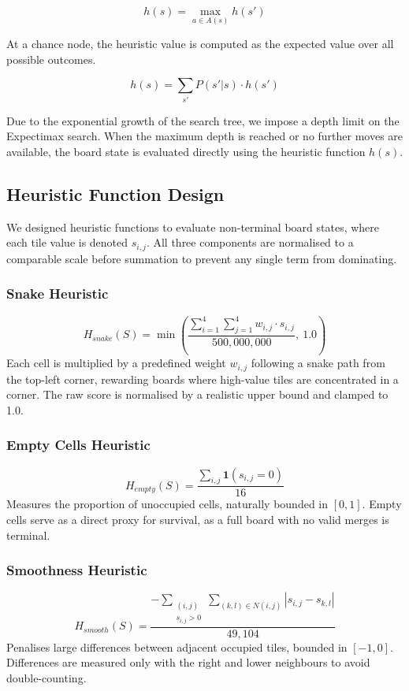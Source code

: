 \documentclass{article}
\begin{document}
$$h(s) = \max_{a \in A(s)} h(s')$$

At a chance node, the heuristic value is computed as the expected value over all possible outcomes.

$$h(s) = \sum_{s'} P(s'|s) \cdot h(s')$$

Due to the exponential growth of the search tree, we impose a depth limit on the Expectimax search.
When the maximum depth is reached or no further moves are available, the board state is evaluated directly
using the heuristic function $h(s)$.

\subsection{Heuristic Function Design}
We designed heuristic functions to evaluate non-terminal board states, where each tile value is denoted $s_{i,j}$.
All three components are normalised to a comparable scale before summation to prevent any single term from dominating.

\subsubsection{Snake Heuristic}
$$H_{snake}(S) = \min\!\left(\frac{\sum_{i=1}^{4} \sum_{j=1}^{4} w_{i,j} \cdot s_{i,j}}{500{,}000{,}000},\ 1.0\right)$$
Each cell is multiplied by a predefined weight $w_{i,j}$ following a snake path from the top-left corner,
rewarding boards where high-value tiles are concentrated in a corner. The raw score is normalised by a
realistic upper bound and clamped to 1.0.

\subsubsection{Empty Cells Heuristic}
$$H_{empty}(S) = \frac{\sum_{i,j} \mathbf{1}(s_{i,j} = 0)}{16}$$
Measures the proportion of unoccupied cells, naturally bounded in $[0, 1]$. Empty cells serve as a direct
proxy for survival, as a full board with no valid merges is terminal.

\subsubsection{Smoothness Heuristic}
$$H_{smooth}(S) = \frac{-\displaystyle\sum_{\substack{(i,j) \\ s_{i,j} > 0}} \sum_{(k,l)\in N(i,j)} |s_{i,j} - s_{k,l}|}{49{,}104}$$
Penalises large differences between adjacent occupied tiles, bounded in $[-1, 0]$. Differences are measured
only with the right and lower neighbours to avoid double-counting.
\end{document}
